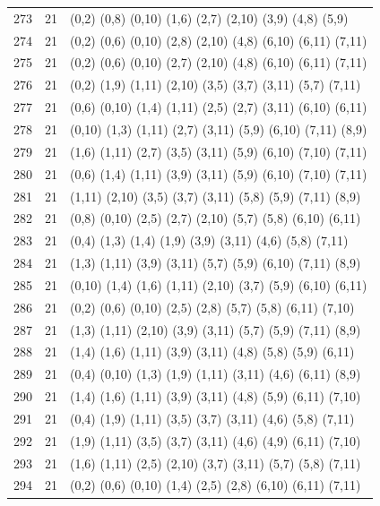 \begin{appendix}
{\begin{longtable}{lll}
273& 21 & (0,2)   (0,8)  (0,10) (1,6)   (2,7)   (2,10)  (3,9)   (4,8)   (5,9)\\
274& 21 & (0,2)   (0,6)  (0,10) (2,8)   (2,10)  (4,8)   (6,10)  (6,11)  (7,11)\\
275& 21 & (0,2)   (0,6)  (0,10) (2,7)   (2,10)  (4,8)   (6,10)  (6,11)  (7,11)\\
276& 21 & (0,2)   (1,9)  (1,11) (2,10)  (3,5)   (3,7)   (3,11)  (5,7)   (7,11)\\
277& 21 & (0,6)   (0,10) (1,4)  (1,11)  (2,5)   (2,7)   (3,11)  (6,10)  (6,11)\\
278& 21 & (0,10)  (1,3)  (1,11) (2,7)   (3,11)  (5,9)   (6,10)  (7,11)  (8,9)\\
279& 21 & (1,6)   (1,11) (2,7)  (3,5)   (3,11)  (5,9)   (6,10)  (7,10)  (7,11)\\
280& 21 & (0,6)   (1,4)  (1,11) (3,9)   (3,11)  (5,9)   (6,10)  (7,10)  (7,11)\\
281& 21 & (1,11)  (2,10) (3,5)  (3,7)   (3,11)  (5,8)   (5,9)   (7,11)  (8,9)\\
282& 21 & (0,8)   (0,10) (2,5)  (2,7)   (2,10)  (5,7)   (5,8)   (6,10)  (6,11)\\
283& 21 & (0,4)   (1,3)  (1,4)  (1,9)   (3,9)   (3,11)  (4,6)   (5,8)   (7,11)\\
284& 21 & (1,3)   (1,11) (3,9)  (3,11)  (5,7)   (5,9)   (6,10)  (7,11)  (8,9)\\
285& 21 & (0,10)  (1,4)  (1,6)  (1,11)  (2,10)  (3,7)   (5,9)   (6,10)  (6,11)\\
286& 21 & (0,2)   (0,6)  (0,10) (2,5)   (2,8)   (5,7)   (5,8)   (6,11)  (7,10)\\
287& 21 & (1,3)   (1,11) (2,10) (3,9)   (3,11)  (5,7)   (5,9)   (7,11)  (8,9)\\
288& 21 & (1,4)   (1,6)  (1,11) (3,9)   (3,11)  (4,8)   (5,8)   (5,9)   (6,11)\\
289& 21 & (0,4)   (0,10) (1,3)  (1,9)   (1,11)  (3,11)  (4,6)   (6,11)  (8,9)\\
290& 21 & (1,4)   (1,6)  (1,11) (3,9)   (3,11)  (4,8)   (5,9)   (6,11)  (7,10)\\
291& 21 & (0,4)   (1,9)  (1,11) (3,5)   (3,7)   (3,11)  (4,6)   (5,8)   (7,11)\\
292& 21 & (1,9)   (1,11) (3,5)  (3,7)   (3,11)  (4,6)   (4,9)   (6,11)  (7,10)\\
293& 21 & (1,6)   (1,11) (2,5)  (2,10)  (3,7)   (3,11)  (5,7)   (5,8)   (7,11)\\
294& 21 & (0,2)   (0,6)  (0,10) (1,4)   (2,5)   (2,8)   (6,10)  (6,11)  (7,11)\\

\end{longtable}}
\end{appendix}
